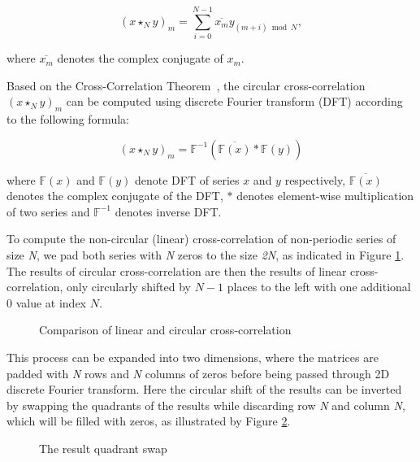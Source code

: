 \[
(x \star_N y)_m = \sum_{i=0}^{N-1} \overline{x_m} y_{(m + i) \bmod N},
\]

where $\overline{x_m}$ denotes the complex conjugate of $x_m$.


Based on the Cross-Correlation Theorem~\cite{bracewell1966fourier}, the circular cross-correlation $(x \star_N y)_m$ can be computed using discrete Fourier transform (DFT) according to the following formula:

\[
(x \star_N y)_m = \mathbb{F}^{-1}(\overline{\mathbb{F}(x)}*\mathbb{F}(y))
\]

where $\mathbb{F}(x)$ and $\mathbb{F}(y)$ denote DFT of series $x$ and $y$ respectively, $\overline{\mathbb{F}(x)}$ denotes the complex conjugate of the DFT, $*$ denotes element-wise multiplication of two series and $\mathbb{F}^{-1}$ denotes inverse DFT.

To compute the non-circular (linear) cross-correlation of non-periodic series of size \textit{N}, we pad both series with \textit{N} zeros to the size \textit{2N}, as indicated in Figure \ref{fig:circular_cross_corr}. The results of circular cross-correlation are then the results of linear cross-correlation, only circularly shifted by $N-1$ places to the left with one additional 0 value at index $N$.

\begin{figure}[h]
	\centering
	\def\svgwidth{0.8\textwidth}
	\fontsize{9}{12}\selectfont
	
	\caption{Comparison of linear and circular cross-correlation}
	\label{fig:circular_cross_corr}
\end{figure}


This process can be expanded into two dimensions, where the matrices are padded with \textit{N} rows and \textit{N} columns of zeros before being passed through 2D discrete Fourier transform. Here the circular shift of the results can be inverted by swapping the quadrants of the results while discarding row \textit{N} and column \textit{N}, which will be filled with zeros, as illustrated by Figure \ref{fig:quadrant_swap}. 

\begin{figure}[h]
	\centering
	\def\svgwidth{0.8\textwidth}
	\fontsize{9}{12}\selectfont
	
	\caption{The result quadrant swap}
	\label{fig:quadrant_swap}
\end{figure}


